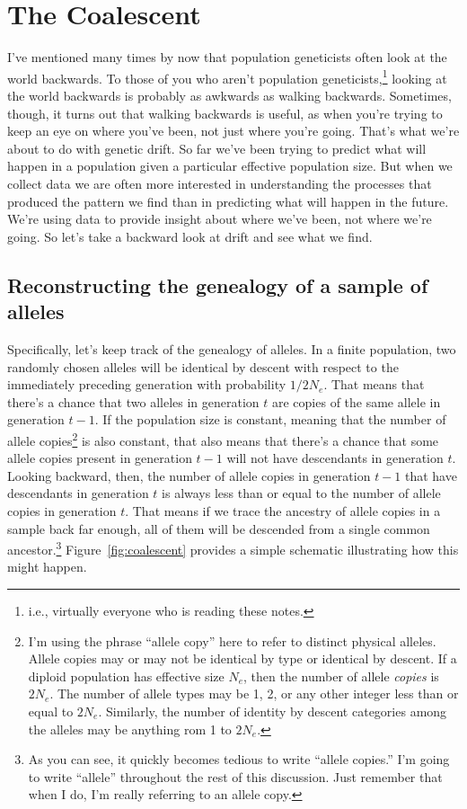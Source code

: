 \chapter{The Coalescent}

I've mentioned many times by now that population geneticists often
look at the world backwards. To those of you who aren't population
geneticists,\footnote{i.e., virtually everyone who is reading these
  notes.} looking at the world backwards is probably as awkwards as
walking backwards. Sometimes, though, it turns out that walking
backwards is useful, as when you're trying to keep an eye on where
you've been, not just where you're going. That's what we're about to
do with genetic drift. So far we've been trying to predict what will
happen in a population given a particular effective population
size. But when we collect data we are often more interested in
understanding the processes that produced the pattern we find than in
predicting what will happen in the future. We're using data to provide
insight about where we've been, not where we're going. So let's take a
backward look at drift and see what we find.


\section*{Reconstructing the genealogy of a sample of
  alleles}

Specifically, let's keep track of the genealogy of alleles. In a
finite population, two randomly chosen alleles will be identical by
descent with respect to the immediately preceding generation with
probability $1/2N_e$. That means that there's a chance that two
alleles in generation $t$ are copies of the same allele in generation
$t-1$. If the population size is constant, meaning that the number of
allele copies\footnote{I'm using the phrase ``allele copy'' here to
  refer to distinct physical alleles. Allele copies may or may not be
  identical by type or identical by descent. If a diploid population
  has effective size $N_e$, then the number of allele {\it copies\/}
  is $2N_e$. The number of allele types may be 1, 2, or any other
  integer less than or equal to $2N_e$. Similarly, the number of
  identity by descent categories among the alleles may be anything rom
  1 to $2N_e$.} is also constant, that also means
that there's a chance that some allele copies present in generation
$t-1$ will not have descendants in generation $t$. Looking backward,
then, the number of allele copies in generation $t-1$ that have
descendants in generation $t$ is always less than or equal to the
number of allele copies in generation $t$. That means if we trace the
ancestry of allele copies in a sample back far enough, all of them
will be descended from a single common ancestor.\footnote{As you can
  see, it quickly becomes tedious to write ``allele copies.'' I'm
  going to write ``allele'' throughout the rest of this
  discussion. Just remember that when I do, I'm really referring to an
  allele copy.}  Figure~\ref{fig:coalescent} provides a simple
schematic illustrating how this might happen.

